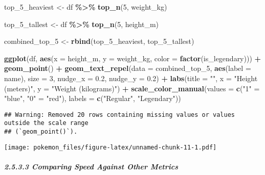 \documentclass[
]{article}
\newenvironment{Shaded}{\begin{snugshade}}{\end{snugshade}}
\newcommand{\AttributeTok}[1]{\textcolor[rgb]{0.13,0.29,0.53}{#1}}
\newcommand{\DecValTok}[1]{\textcolor[rgb]{0.00,0.00,0.81}{#1}}
\newcommand{\FloatTok}[1]{\textcolor[rgb]{0.00,0.00,0.81}{#1}}
\newcommand{\FunctionTok}[1]{\textcolor[rgb]{0.13,0.29,0.53}{\textbf{#1}}}
\newcommand{\NormalTok}[1]{#1}
\newcommand{\OtherTok}[1]{\textcolor[rgb]{0.56,0.35,0.01}{#1}}
\newcommand{\SpecialCharTok}[1]{\textcolor[rgb]{0.81,0.36,0.00}{\textbf{#1}}}
\newcommand{\StringTok}[1]{\textcolor[rgb]{0.31,0.60,0.02}{#1}}
\begin{document}
\begin{Shaded}
\begin{Highlighting}[]
\NormalTok{top\_5\_heaviest }\OtherTok{\textless{}{-}}\NormalTok{ df }\SpecialCharTok{\%\textgreater{}\%}
  \FunctionTok{top\_n}\NormalTok{(}\DecValTok{5}\NormalTok{, weight\_kg)}

\NormalTok{top\_5\_tallest }\OtherTok{\textless{}{-}}\NormalTok{ df }\SpecialCharTok{\%\textgreater{}\%}
  \FunctionTok{top\_n}\NormalTok{(}\DecValTok{5}\NormalTok{, height\_m)}

\NormalTok{combined\_top\_5 }\OtherTok{\textless{}{-}} \FunctionTok{rbind}\NormalTok{(top\_5\_heaviest, top\_5\_tallest)}

\FunctionTok{ggplot}\NormalTok{(df, }\FunctionTok{aes}\NormalTok{(}\AttributeTok{x =}\NormalTok{ height\_m, }\AttributeTok{y =}\NormalTok{ weight\_kg, }\AttributeTok{color =} \FunctionTok{factor}\NormalTok{(is\_legendary))) }\SpecialCharTok{+}
  \FunctionTok{geom\_point}\NormalTok{() }\SpecialCharTok{+}
  \FunctionTok{geom\_text\_repel}\NormalTok{(}\AttributeTok{data =}\NormalTok{ combined\_top\_5, }\FunctionTok{aes}\NormalTok{(}\AttributeTok{label =}\NormalTok{ name), }\AttributeTok{size =} \DecValTok{3}\NormalTok{, }\AttributeTok{nudge\_x =} \FloatTok{0.2}\NormalTok{, }\AttributeTok{nudge\_y =} \FloatTok{0.2}\NormalTok{) }\SpecialCharTok{+}
  \FunctionTok{labs}\NormalTok{(}\AttributeTok{title =} \StringTok{""}\NormalTok{, }\AttributeTok{x =} \StringTok{"Height (meters)"}\NormalTok{, }\AttributeTok{y =} \StringTok{"Weight (kilograms)"}\NormalTok{) }\SpecialCharTok{+}
  \FunctionTok{scale\_color\_manual}\NormalTok{(}\AttributeTok{values =} \FunctionTok{c}\NormalTok{(}\StringTok{"1"} \OtherTok{=} \StringTok{"blue"}\NormalTok{, }\StringTok{"0"} \OtherTok{=} \StringTok{"red"}\NormalTok{), }\AttributeTok{labels =} \FunctionTok{c}\NormalTok{(}\StringTok{"Regular"}\NormalTok{, }\StringTok{"Legendary"}\NormalTok{))}
\end{Highlighting}
\end{Shaded}

\begin{verbatim}
## Warning: Removed 20 rows containing missing values or values outside the scale range
## (`geom_point()`).
\end{verbatim}

\texttt{[image: pokemon\_files/figure-latex/unnamed-chunk-11-1.pdf]}

\subparagraph{2.5.3.3 Comparing Speed Against Other
Metrics}\label{comparing-speed-against-other-metrics}
\end{document}

